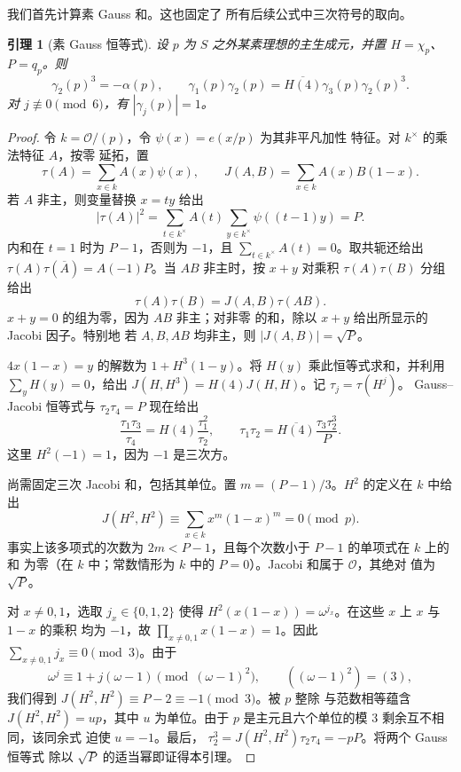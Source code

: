 \documentclass[11pt,a4paper]{article}
\numberwithin{equation}{section}
\numberwithin{figure}{section}
\newtheorem{lemma}[theorem]{引理}
\theoremstyle{definition}
\theoremstyle{remark}
\begin{document}
我们首先计算素 Gauss 和。这也固定了
所有后续公式中三次符号的取向。

\begin{lemma}[素 Gauss 恒等式]\label{lem:prime-gauss-identities}
设 $p$ 为 $S$ 之外某素理想的主生成元，并置
$H=\chi_p$、$P=q_p$。则
\[
 \gamma_2(p)^3=-\alpha(p),\qquad
 \gamma_1(p)\gamma_2(p)
   =\overline{H(4)}\gamma_3(p)\gamma_2(p)^3.
\]
对 $j\not\equiv0\pmod6$，有 $|\gamma_j(p)|=1$。
\end{lemma}

\begin{proof}
令 $k=\mathcal O/(p)$，令 $\psi(x)=e(x/p)$ 为其非平凡加性
特征。对 $k^\times$ 的乘法特征 $A$，按零
延拓，置
\[
 \tau(A)=\sum_{x\in k}A(x)\psi(x),\qquad
 J(A,B)=\sum_{x\in k}A(x)B(1-x).
\]
若 $A$ 非主，则变量替换 $x=ty$ 给出
\[
 |\tau(A)|^2
 =\sum_{t\in k^\times}A(t)\sum_{y\in k^\times}\psi((t-1)y)=P.
\]
内和在 $t=1$ 时为 $P-1$，否则为 $-1$，且
$\sum_{t\in k^\times}A(t)=0$。取共轭还给出
$\tau(A)\tau(\overline A)=A(-1)P$。当 $AB$ 非主时，按 $x+y$ 对乘积
$\tau(A)\tau(B)$ 分组给出
\[
 \tau(A)\tau(B)=J(A,B)\tau(AB).
\]
$x+y=0$ 的组为零，因为 $AB$ 非主；对非零
的和，除以 $x+y$ 给出所显示的 Jacobi 因子。特别地
若 $A,B,AB$ 均非主，则 $|J(A,B)|=\sqrt P$。

$4x(1-x)=y$ 的解数为 $1+H^3(1-y)$。将 $H(y)$
乘此恒等式求和，并利用 $\sum_yH(y)=0$，给出
$J(H,H^3)=H(4)J(H,H)$。记 $\tau_j=\tau(H^j)$。
Gauss--Jacobi 恒等式与 $\tau_2\tau_4=P$ 现在给出
\[
 \frac{\tau_1\tau_3}{\tau_4}
   =H(4)\frac{\tau_1^2}{\tau_2},\qquad
 \tau_1\tau_2=\overline{H(4)}\frac{\tau_3\tau_2^3}{P}.
\]
这里 $H^2(-1)=1$，因为 $-1$ 是三次方。

尚需固定三次 Jacobi 和，包括其单位。置
$m=(P-1)/3$。$H^2$ 的定义在 $k$ 中给出
\[
 J(H^2,H^2)\equiv\sum_{x\in k}x^m(1-x)^m=0\pmod p.
\]
事实上该多项式的次数为 $2m<P-1$，且每个次数小于 $P-1$ 的单项式在 $k$ 上的和
为零（在 $k$ 中；常数情形为 $k$
中的 $P=0$）。Jacobi 和属于 $\mathcal O$，其绝对
值为 $\sqrt P$。

对 $x\ne0,1$，选取 $j_x\in\{0,1,2\}$ 使得
$H^2(x(1-x))=\omega^{j_x}$。在这些 $x$ 上 $x$ 与 $1-x$ 的乘积
均为 $-1$，故 $\prod_{x\ne0,1}x(1-x)=1$。因此
$\sum_{x\ne0,1}j_x\equiv0\pmod3$。由于
\[
 \omega^j\equiv1+j(\omega-1)\pmod{(\omega-1)^2},
 \qquad ((\omega-1)^2)=(3),
\]
我们得到 $J(H^2,H^2)\equiv P-2\equiv-1\pmod3$。被 $p$ 整除
与范数相等蕴含 $J(H^2,H^2)=up$，其中 $u$ 为单位。由于 $p$
是主元且六个单位的模 $3$ 剩余互不相同，该同余式
迫使 $u=-1$。最后，
$\tau_2^3=J(H^2,H^2)\tau_2\tau_4=-pP$。将两个 Gauss 恒等式
除以 $\sqrt P$ 的适当幂即证得本引理。
\end{proof}
\end{document}
